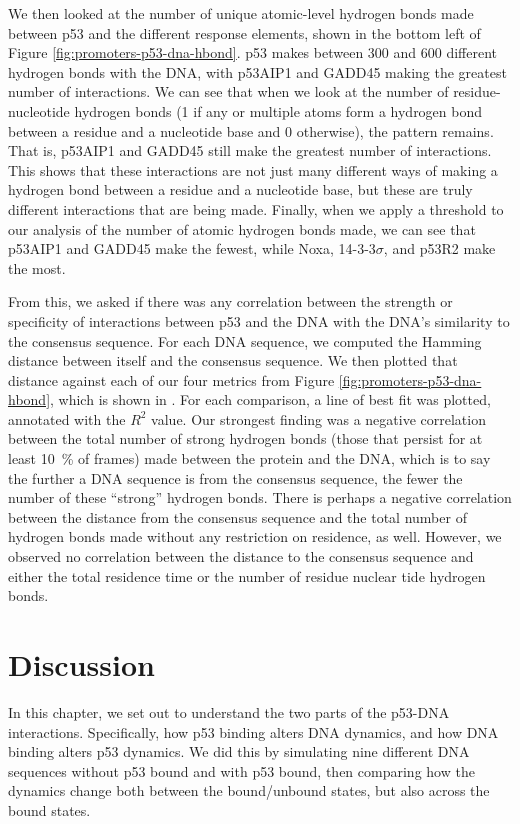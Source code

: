 We then looked at the number of unique atomic-level hydrogen bonds made between p53 and the different response elements, shown in the bottom left of Figure \ref{fig:promoters-p53-dna-hbond}. p53 makes between \num{300} and \num{600} different hydrogen bonds with the DNA, with p53AIP1 and GADD45 making the greatest number of interactions. We can see that when we look at the number of residue-nucleotide hydrogen bonds (\num{1} if any or multiple atoms form a hydrogen bond between a residue and a nucleotide base and \num{0} otherwise), the pattern remains. That is, p53AIP1 and GADD45 still make the greatest number of interactions. This shows that these interactions are not just many different ways of making a hydrogen bond between a residue and a nucleotide base, but these are truly different interactions that are being made. Finally, when we apply a threshold to our analysis of the number of atomic hydrogen bonds made, we can see that p53AIP1 and GADD45 make the fewest, while Noxa, 14-3-3\(\sigma\), and p53R2 make the most.

From this, we asked if there was any correlation between the strength or specificity of interactions between p53 and the DNA with the DNA's similarity to the consensus sequence. For each DNA sequence, we computed the Hamming distance between itself and the consensus sequence. We then plotted that distance against each of our four metrics from Figure \ref{fig:promoters-p53-dna-hbond}, which is shown in . For each comparison, a line of best fit was plotted, annotated with the \(R^{2}\) value. Our strongest finding was a negative correlation between the total number of strong hydrogen bonds (those that persist for at least \qty{10}{\percent} of frames) made between the protein and the DNA, which is to say the further a DNA sequence is from the consensus sequence, the fewer the number of these ``strong'' hydrogen bonds. There is perhaps a negative correlation between the distance from the consensus sequence and the total number of hydrogen bonds made without any restriction on residence, as well. However, we observed no correlation between the distance to the consensus sequence and either the total residence time or the number of residue nuclear tide hydrogen bonds. 

\section{Discussion}

In this chapter, we set out to understand the two parts of the p53-DNA interactions. Specifically, how p53 binding alters DNA dynamics, and how DNA binding alters p53 dynamics. We did this by simulating nine different DNA sequences without p53 bound and with p53 bound, then comparing how the dynamics change both between the bound/unbound states, but also across the bound states.

